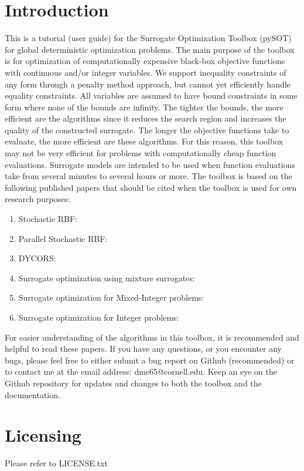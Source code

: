 \documentclass[]{article}
\begin{document}
\section{Introduction}
This is a tutorial (user guide) for the Surrogate Optimization Toolbox (pySOT) for global deterministic optimization problems. The main purpose of the toolbox is for optimization of computationally expensive black-box objective functions with continuous and/or integer variables. We support inequality constraints of any form through a penalty method approach, but cannot yet efficiently handle equality constraints. All variables are assumed to have bound constraints in some form where none of the bounds are infinity. The tighter the bounds, the more efficient are the algorithms since it reduces the search region and increases the quality of the constructed surrogate. The longer the objective functions take to evaluate, the more efficient are these algorithms. For this reason, this toolbox may not be very efficient for problems with computationally cheap function evaluations. Surrogate models are intended to be used when function evaluations take from several minutes to several hours or more. The toolbox is based on the following published papers that should be cited when the toolbox is used for own research purposes:
\begin{enumerate}
\item Stochastic RBF: \cite{regis2007stochastic}
\item Parallel Stochastic RBF: \cite{regis2009parallel}
\item DYCORS: \cite{regis2013combining}
\item Surrogate optimization using mixture surrogates: \cite{muller2011mixture}
\item Surrogate optimization for Mixed-Integer problems: \cite{muller2013so}
\item Surrogate optimization for Integer problems: \cite{muller2014so}
\end{enumerate}
For easier understanding of the algorithms in this toolbox, it is recommended and helpful to read these papers. If you have any questions, or you encounter any bugs, please feel free to either submit a bug report on Github (recommended) or to contact me at the email address: dme65@cornell.edu. Keep an eye on the Github repository for updates and changes to both the toolbox and the documentation.

\section{Licensing} Please refer to LICENSE.txt
\end{document}
